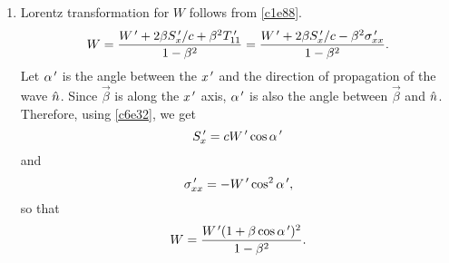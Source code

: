 \begin{enumerate}
\item Lorentz transformation for $W$ follows from \eqref{c1e88}.
\begin{equation}\label{c6e35}
W = \frac{W^{\,\prime} + 2\beta S^{\,\prime}_x/c + \beta^2T_{11}^{\,\prime}}{1 - \beta^2}
 = \frac{W^{\,\prime} + 2\beta S^{\,\prime}_x/c - \beta^2\sigma_{xx}^{\,\prime}}{1 - \beta^2}.
\end{equation}
Let $\alpha^{\,\prime}$ is the angle between the $x^{\,\prime}$ and the direction of 
propagation of the wave $\hat{n}$. Since $\vec{\beta}$ is along the $x^{\,\prime}$ axis,
$\alpha^{\,\prime}$ is also the angle between $\vec{\beta}$ and $\hat{n}$. Therefore,
using \eqref{c6e32}, we get
\[
S_x^{\,\prime} = cW^{\,\prime}\cos\alpha^{\,\prime}
\]
and 
\begin{equation}\label{c6e36}
\sigma_{xx}^{\,\prime} = -W^{\,\prime}\cos^2\alpha^{\,\prime},
\end{equation}
so that
\begin{equation}\label{c6e37}
W = \frac{W^{\,\prime}(1 + \beta\cos\alpha^{\,\prime})^2}{1 - \beta^2}.
\end{equation}


\end{enumerate}
